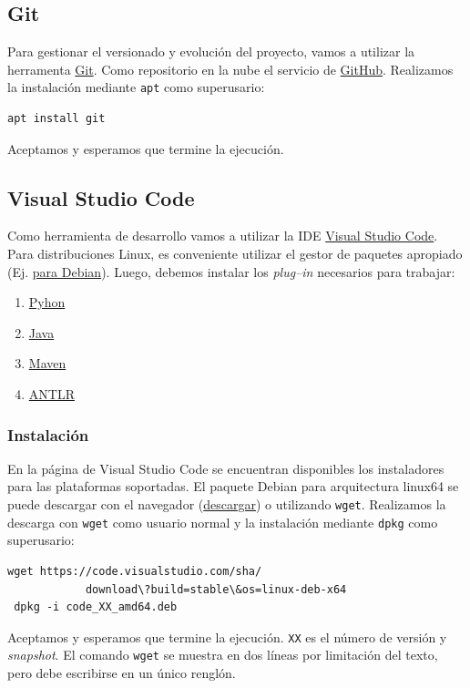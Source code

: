 \subsection{Git}
\label{git}

Para gestionar el versionado y evolución del proyecto, vamos a utilizar la herramenta \href{https://git-scm.com/}{Git}.  Como repositorio en la nube el servicio de \href{https://github.com/}{GitHub}.
Realizamos la instalación mediante \verb|apt| como superusario:
\begin{lstlisting}[style=consola]
  apt install git
\end{lstlisting}
Aceptamos y esperamos que termine la ejecución.


\subsection{Visual Studio Code}
\label{vscode}

Como herramienta de desarrollo vamos a utilizar la IDE \href{https://code.visualstudio.com/}{Visual Studio Code}.  Para distribuciones Linux, es conveniente utilizar el gestor de paquetes apropiado (Ej. \href{https://wiki.debian.org/VisualStudioCode}{para Debian}). Luego, debemos instalar los \emph{plug--in} necesarios para trabajar:
\begin{enumerate}
	\ifx\python\undefined
	\item \hyperref[pluginPython]{Pyhon}
	\fi
	\item \hyperref[pluginJava]{Java}
	\item \hyperref[pluginMaven]{Maven}
	\item \hyperref[pluginANTLR]{ANTLR}
\end{enumerate}

\subsubsection{Instalación}
\label{vscodeInst}

En la página de Visual Studio Code se encuentran disponibles los instaladores para las plataformas soportadas.  El paquete Debian para arquitectura linux64 se puede descargar con el navegador (\href{https://code.visualstudio.com/docs/?dv=linux64_deb}{descargar}) o utilizando \verb|wget|.
Realizamos la descarga con \verb|wget| como usuario normal y la instalación mediante \verb|dpkg| como superusario:
\begin{lstlisting}[style=consola]
 wget https://code.visualstudio.com/sha/
            download\?build=stable\&os=linux-deb-x64
 dpkg -i code_XX_amd64.deb 
\end{lstlisting}
Aceptamos y esperamos que termine la ejecución.  \verb|XX| es el número de versión y \emph{snapshot}.  El comando \verb|wget| se muestra en dos líneas por limitación del texto, pero debe escribirse en un único renglón.

